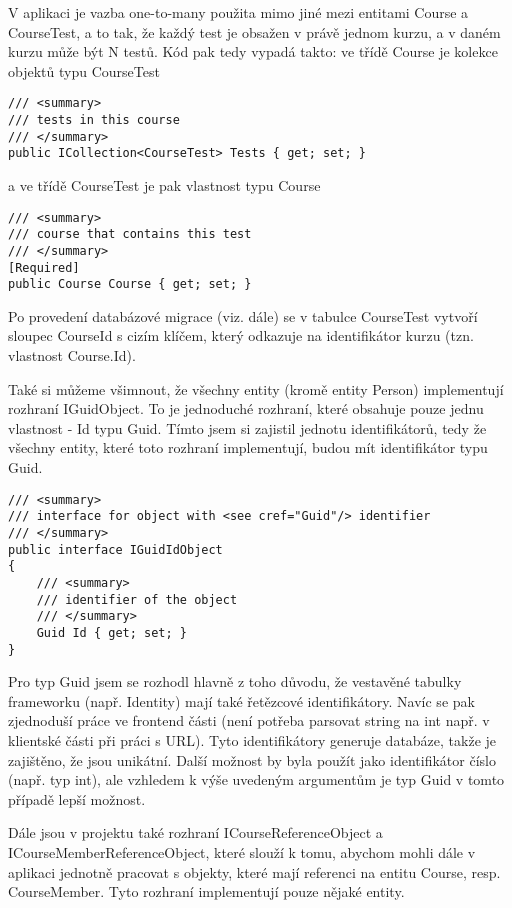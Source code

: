 V aplikaci je vazba one-to-many použita mimo jiné mezi entitami Course a CourseTest, a to tak, že každý test je obsažen v právě jednom kurzu, a v daném kurzu může být N testů.
Kód pak tedy vypadá takto: ve třídě Course je kolekce objektů typu CourseTest

\begin{lstlisting}
/// <summary>
/// tests in this course
/// </summary>
public ICollection<CourseTest> Tests { get; set; }
\end{lstlisting}

a ve třídě CourseTest je pak vlastnost typu Course

\begin{lstlisting}
/// <summary>
/// course that contains this test
/// </summary>
[Required]
public Course Course { get; set; }
\end{lstlisting}

Po provedení databázové migrace (viz. dále) se v tabulce CourseTest vytvoří sloupec CourseId s cizím klíčem, který odkazuje na identifikátor kurzu (tzn. vlastnost Course.Id).

Také si můžeme všimnout, že všechny entity (kromě entity Person) implementují rozhraní IGuidObject. To je jednoduché rozhraní, které obsahuje pouze jednu vlastnost - Id typu Guid. Tímto jsem si zajistil jednotu identifikátorů, tedy že všechny entity, které toto rozhraní implementují, budou mít identifikátor typu Guid.

\begin{lstlisting}
/// <summary>
/// interface for object with <see cref="Guid"/> identifier
/// </summary>
public interface IGuidIdObject
{
	/// <summary>
	/// identifier of the object
	/// </summary>
	Guid Id { get; set; }
}
\end{lstlisting}


Pro typ Guid jsem se rozhodl hlavně z toho důvodu, že vestavěné tabulky frameworku (např. Identity) mají také řetězcové identifikátory. Navíc se pak zjednoduší práce ve frontend části (není potřeba parsovat string na int např. v klientské části při práci s URL). Tyto identifikátory generuje databáze, takže je zajištěno, že jsou unikátní.
Další možnost by byla použít jako identifikátor číslo (např. typ int), ale vzhledem k výše uvedeným argumentům je typ Guid v tomto případě lepší možnost.

Dále jsou v projektu také rozhraní ICourseReferenceObject a ICourseMemberReferenceObject, které slouží k tomu, abychom mohli dále v aplikaci jednotně pracovat s objekty, které mají referenci na entitu Course, resp. CourseMember. Tyto rozhraní implementují pouze nějaké entity.

